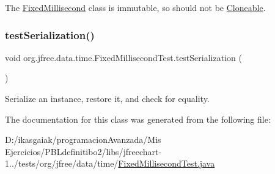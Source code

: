 The \mbox{\hyperlink{classorg_1_1jfree_1_1data_1_1time_1_1_fixed_millisecond}{Fixed\+Millisecond}} class is immutable, so should not be \mbox{\hyperlink{}{Cloneable}}. \mbox{\label{classorg_1_1jfree_1_1data_1_1time_1_1_fixed_millisecond_test_a72ed04b403a98617509718dc7b690065}} 
\subsubsection{\texorpdfstring{test\+Serialization()}{testSerialization()}}
{\footnotesize\ttfamily void org.\+jfree.\+data.\+time.\+Fixed\+Millisecond\+Test.\+test\+Serialization (\begin{DoxyParamCaption}{ }\end{DoxyParamCaption})}

Serialize an instance, restore it, and check for equality. 

The documentation for this class was generated from the following file\+:\begin{DoxyCompactItemize}
\item 
D\+:/ikasgaiak/programacion\+Avanzada/\+Mis Ejercicios/\+P\+B\+Ldefinitibo2/libs/jfreechart-\/1../tests/org/jfree/data/time/\mbox{\hyperlink{_fixed_millisecond_test_8java}{Fixed\+Millisecond\+Test.\+java}}\end{DoxyCompactItemize}
